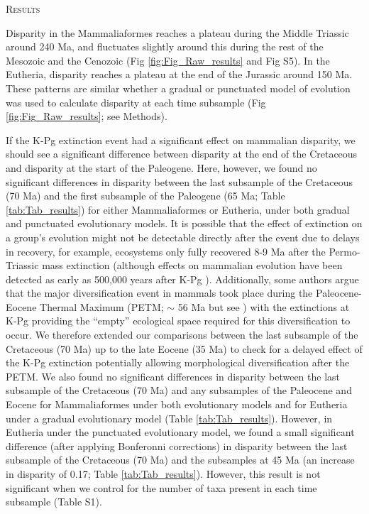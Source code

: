 \documentclass[12pt,letterpaper]{article}
\renewcommand{\section}[1]{%
\bigskip
\begin{center}
\begin{Large}
\normalfont\scshape #1
\medskip
\end{Large}
\end{center}}
\begin{document}
%
%

\section{Results}
Disparity in the Mammaliaformes reaches a plateau during the Middle Triassic around 240 Ma, and fluctuates slightly around this during the rest of the Mesozoic and the Cenozoic (Fig \ref{fig:Fig_Raw_results} and Fig S5).
In the Eutheria, disparity reaches a plateau at the end of the Jurassic around 150 Ma.
These patterns are similar whether a gradual or punctuated model of evolution was used to calculate disparity at each time subsample (Fig \ref{fig:Fig_Raw_results}; see Methods).

If the K-Pg extinction event had a significant effect on mammalian disparity, we should see a significant difference between disparity at the end of the Cretaceous and disparity at the start of the Paleogene.
Here, however, we found no significant differences in disparity between the last subsample of the Cretaceous (70 Ma) and the first subsample of the Paleogene (65 Ma; Table \ref{tab:Tab_results}) for either Mammaliaformes or Eutheria, under both gradual and punctuated evolutionary models. 
It is possible that the effect of extinction on a group's evolution might not be detectable directly after the event due to delays in recovery, for example, ecosystems only fully recovered 8-9 Ma after the Permo-Triassic mass extinction \cite{chen2012timing} (although effects on mammalian evolution have been detected as early as 500,000 years after K-Pg \cite{Wilson2013}).
Additionally, some authors argue that the major diversification event in mammals took place during the Paleocene-Eocene Thermal Maximum (PETM; $\sim$ 56 Ma \cite{bininda2007delayed} but see \cite{meredithimpacts2011,Stadler12042011}) with the extinctions at K-Pg providing the ``empty'' ecological space required for this diversification to occur.
We therefore extended our comparisons between the last subsample of the Cretaceous (70 Ma) up to the late Eocene (35 Ma) to check for a delayed effect of the K-Pg extinction potentially allowing morphological diversification after the PETM. 
We also found no significant differences in disparity between the last subsample of the Cretaceous (70 Ma) and any subsamples of the Paleocene and Eocene for Mammaliaformes under both evolutionary models and for Eutheria under a gradual evolutionary model (Table \ref{tab:Tab_results}).
However, in Eutheria under the punctuated evolutionary model, we found a small significant difference (after applying Bonferonni corrections) in disparity between the last subsample of the Cretaceous (70 Ma) and the subsamples at 45 Ma (an increase in disparity of 0.17; Table \ref{tab:Tab_results}).
However, this result is not significant when we control for the number of taxa present in each time subsample (Table S1). 
\end{document}
